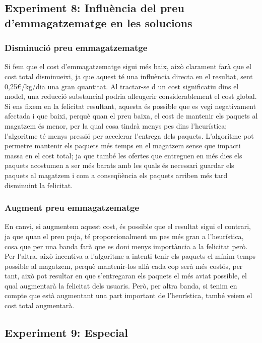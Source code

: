 \documentclass[a4paper]{article}
\begin{document}
	
	\subsection{Experiment 8: Influència del preu d'emmagatzematge en les solucions}
	
	\subsubsection{Disminució preu emmagatzematge}
	
	Si fem que el cost d'emmagatzematge sigui més baix, això clarament farà que el cost total disminueixi, ja que aquest té una influència directa en el resultat, sent 0,25€/kg/dia una gran quantitat. Al tractar-se d un  cost significatiu dins el model, una reducció substancial podria alleugerir considerablement el cost global. Si ens fixem en la felicitat resultant, aquesta és possible que es vegi negativament afectada i que baixi, perquè quan el preu baixa, el cost de mantenir els paquets al magatzem és menor, per la qual cosa tindrà menys pes dins l'heurística; l'algoritme té menys pressió per accelerar l'entrega dels paquets. L'algoritme pot permetre mantenir els paquets més temps en el magatzem sense que impacti massa en el cost total; ja que també les ofertes que entreguen en més dies els paquets acostumen a ser més barats amb les quals és necessari guardar els paquets al magatzem i com a conseqüència els paquets arriben més tard disminuint la felicitat.\\
	
	\subsubsection{Augment preu emmagatzematge}

	En canvi, si augmentem aquest cost, és possible que el resultat sigui el contrari, ja que quan el preu puja, té proporcionalment un pes més gran a l'heurística, cosa que per una banda farà que es doni menys importància a la felicitat però. Per l'altra, això incentiva a l'algoritme a intenti tenir els paquets el mínim temps possible al magatzem, perquè mantenir-los allà cada cop serà més costós, per tant, això pot resultar en que s'entregaran els paquets el més aviat possible, el qual augmentarà la felicitat dels usuaris. Però, per altra banda, si tenim en compte que està augmentant una part important de l'heurística, també veiem el cost total augmentarà.\\


	\subsection{Experiment 9: Especial}
	
\end{document}
